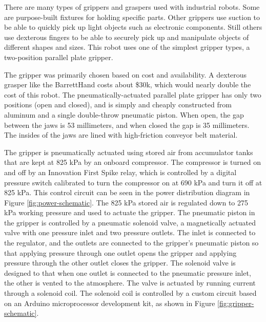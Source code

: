 \documentclass[]{cwru} %
\begin{document}
There are many types of grippers and graspers used with industrial
robots. Some are purpose-built fixtures for holding specific parts.
Other grippers use suction to be able to quickly pick up light objects
such as electronic components. Still others use dexterous fingers to be
able to securely pick up and manipulate objects of different shapes and
sizes. This robot uses one of the simplest gripper types, a two-position
parallel plate gripper.

The gripper was primarily chosen based on cost and availability. A
dexterous grasper like the BarrettHand costs about \$30k, which would
nearly double the cost of this robot. The pneumatically-actuated
parallel plate gripper has only two positions (open and closed), and is
simply and cheaply constructed from aluminum and a single double-throw
pneumatic piston. When open, the gap between the jaws is 53 millimeters,
and when closed the gap is 35 millimeters. The insides of the jaws are
lined with high-friction conveyor belt material.

The gripper is pneumatically actuated using stored air from accumulator
tanks that are kept at 825 kPa by an onboard compressor. The compressor
is turned on and off by an Innovation First Spike relay, which is
controlled by a digital pressure switch calibrated to turn the
compressor on at 690 kPa and turn it off at 825 kPa. This control
circuit can be seen in the power distribution diagram in 
Figure \ref{fig:power-schematic}. The 825 kPa stored air is regulated down to 
275 kPa working pressure and used to actuate the gripper. The pneumatic piston 
in the gripper is controlled by a pneumatic solenoid valve, a magnetically 
actuated valve with one pressure inlet and two pressure outlets. The inlet is 
connected to the regulator, and the outlets are connected to the gripper's
pneumatic piston so that applying pressure through one outlet opens the
gripper and applying pressure through the other outlet closes the
gripper. The solenoid valve is designed to that when one outlet is
connected to the pneumatic pressure inlet, the other is vented to the
atmosphere. The valve is actuated by running current through a solenoid
coil. The solenoid coil is controlled by a custom circuit based on an
Arduino microprocessor development kit, as shown in Figure 
\ref{fig:gripper-schematic}.
\end{document}
